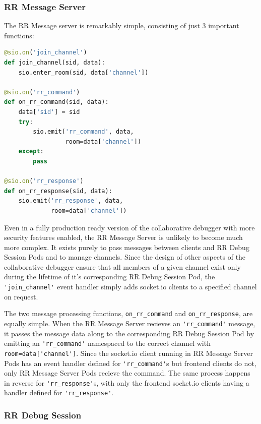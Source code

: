 \documentclass[12pt]{article}
\begin{document}
\subsubsection{RR Message Server}

The RR Message server is remarkably simple, consisting of just 3
important functions:\\

\begin{lstlisting}[language=Python,basicstyle=\linespread{0.5}\ttfamily\small,caption={RR Message Server},captionpos=b]
@sio.on('join_channel')
def join_channel(sid, data):
    sio.enter_room(sid, data['channel'])

@sio.on('rr_command')
def on_rr_command(sid, data):
    data['sid'] = sid
    try:
        sio.emit('rr_command', data,
                 room=data['channel'])
    except:
        pass

@sio.on('rr_response')
def on_rr_response(sid, data):
    sio.emit('rr_response', data,
             room=data['channel'])
\end{lstlisting}

Even in a fully production ready version of the collaborative debugger
with more security features enabled, the RR Message Server is unlikely
to become much more complex.  It exists purely to pass messages
between clients and RR Debug Session Pods and to manage channels.
Since the design of other aspects of the collaborative debugger ensure
that all members of a given channel exist only during the lifetime of
it's corresponding RR Debug Session Pod, the
\lstinline{'join_channel'} event handler simply adds socket.io clients
to a specified channel on request.
\par

The two message processing functions, \lstinline{on_rr_command} and
\lstinline{on_rr_response}, are equally simple.  When the RR Message
Server recieves an \lstinline{'rr_command'} message, it passes the
message data along to the corresponding RR Debug Session Pod by
emitting an \lstinline{'rr_command'} namespaced to the correct channel
with \lstinline{room=data['channel']}.  Since the socket.io client
running in RR Message Server Pods has an event handler defined for
\lstinline{'rr_command'}s but frontend clients do not, only RR Message
Server Pods recieve the command.  The same process happens in reverse
for \lstinline{'rr_response'}s, with only the frontend socket.io
clients having a handler defined for \lstinline{'rr_response'}.


\subsubsection{RR Debug Session}
\end{document}
